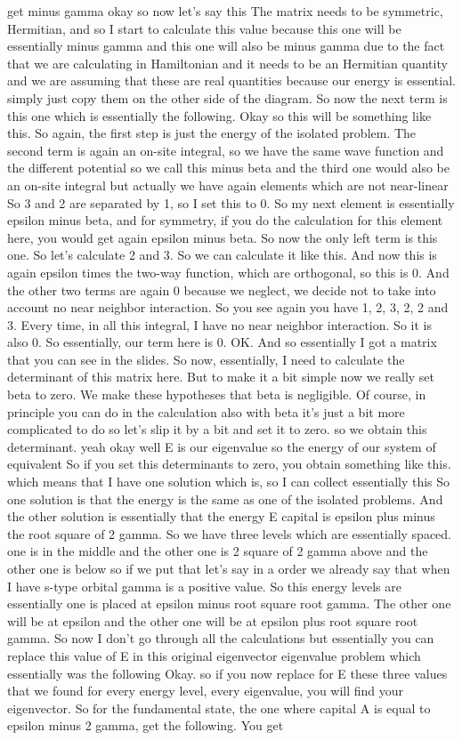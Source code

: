 get minus gamma okay so now let's say this The matrix needs to be symmetric, Hermitian, and so I start to calculate this value because this one will be essentially minus gamma and this one will also be minus gamma due to the fact that we are calculating in Hamiltonian and it needs to be an Hermitian quantity and we are assuming that these are real quantities because our energy is essential. simply just copy them on the other side of the diagram. So now the next term is this one which is essentially the following. Okay so this will be something like this. So again, the first step is just the energy of the isolated problem. The second term is again an on-site integral, so we have the same wave function and the different potential so we call this minus beta and the third one would also be an on-site integral but actually we have again elements which are not near-linear So 3 and 2 are separated by 1, so I set this to 0. So my next element is essentially epsilon minus beta, and for symmetry, if you do the calculation for this element here, you would get again epsilon minus beta. So now the only left term is this one. So let's calculate 2 and 3. So we can calculate it like this. And now this is again epsilon times the two-way function, which are orthogonal, so this is 0. And the other two terms are again 0 because we neglect, we decide not to take into account no near neighbor interaction. So you see again you have 1, 2, 3, 2, 2 and 3. Every time, in all this integral, I have no near neighbor interaction. So it is also 0. So essentially, our term here is 0. OK. And so essentially I got a matrix that you can see in the slides. So now, essentially, I need to calculate the determinant of this matrix here. But to make it a bit simple now we really set beta to zero. We make these hypotheses that beta is negligible. Of course, in principle you can do in the calculation also with beta it's just a bit more complicated to do so let's slip it by a bit and set it to zero. so we obtain this determinant. yeah okay well E is our eigenvalue so the energy of our system of equivalent So if you set this determinants to zero, you obtain something like this. which means that I have one solution which is, so I can collect essentially this So one solution is that the energy is the same as one of the isolated problems. And the other solution is essentially that the energy E capital is epsilon plus minus the root square of 2 gamma. So we have three levels which are essentially spaced. one is in the middle and the other one is 2 square of 2 gamma above and the other one is below so if we put that let's say in a order we already say that when I have s-type orbital gamma is a positive value. So this energy levels are essentially one is placed at epsilon minus root square root gamma. The other one will be at epsilon and the other one will be at epsilon plus root square root gamma. So now I don't go through all the calculations but essentially you can replace this value of E in this original eigenvector eigenvalue problem which essentially was the following Okay. so if you now replace for E these three values that we found for every energy level, every eigenvalue, you will find your eigenvector. So for the fundamental state, the one where capital A is equal to epsilon minus 2 gamma, get the following. You get 